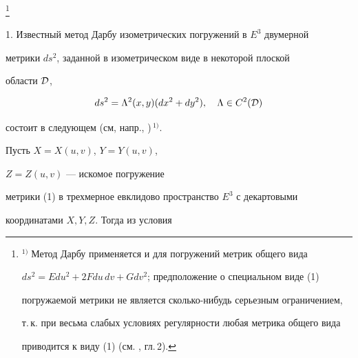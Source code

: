  


\thanks{${}^{1)}\;$Метод Дарбу применяется и для погружений метрик общего вида 


$ds^2=Edu^2+2Fdu\,dv+Gdv^2$; предположение о специальном виде (1) 


погружаемой метрики не является сколько-нибудь серьезным ограничением,


т.\,к. при весьма слабых условиях регулярности любая метрика общего вида 


приводится к виду (1) (см. \cite{Vek}, гл.\,2).} 


\date{} 




 


\pagestyle{plain} %


 


 




 


\maketitle 


 




 


1. Известный метод Дарбу изометрических погружений в $E^3$ двумерной 


метрики $ds^2$, заданной в изометрическом виде в некоторой плоской 


области $\cal D$, 


\begin{equation} 


ds^2=\Lambda^2(x,y)(dx^2+dy^2),\quad\Lambda\in C^2(\cal D) 


\end{equation} 


состоит в следующем (см, напр., \cite{Ef1})$\,{}^{1)}$.


Пусть $X=X(u,v)$, $Y=Y(u,v)$, 


$Z=Z(u,v)$ --- искомое погружение 


метрики (1) в трехмерное евклидово пространство $E^3$ с декартовыми 


координатами $X,Y,Z$. Тогда из условия 


